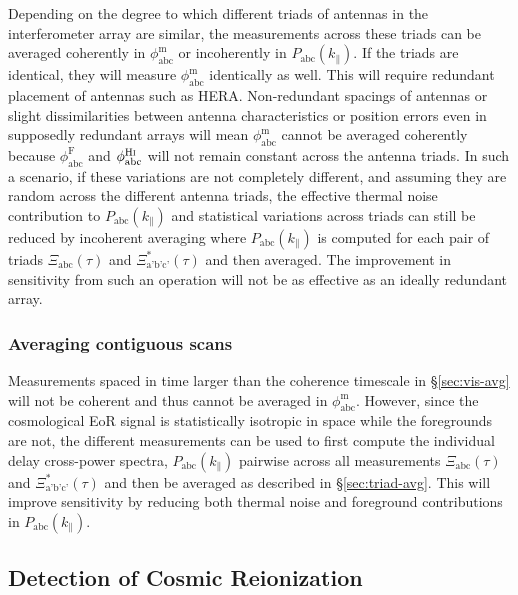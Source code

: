\documentclass[
reprint,
superscriptaddress,
amsmath,
amssymb,
aps,
]{revtex4-1}
\begin{document}
Depending on the degree to which different triads of antennas in the interferometer array are similar, the measurements across these triads can be averaged coherently in $\phi_\textrm{abc}^\textrm{m}$ or incoherently in $P_\textrm{abc}(k_\parallel)$. If the triads are identical, they will measure $\phi_\textrm{abc}^\textrm{m}$ identically as well. This will require redundant placement of antennas such as HERA. Non-redundant spacings of antennas or slight dissimilarities between antenna characteristics or position errors even in supposedly redundant arrays will mean $\phi_\textrm{abc}^\textrm{m}$ cannot be averaged coherently because $\phi_\textrm{abc}^\textrm{F}$ and $\phi_\textrm{abc}^\textrm{H{\sc i}}$ will not remain constant across the antenna triads. In such a scenario, if these variations are not completely different, and assuming they are random across the different antenna triads, the effective thermal noise contribution to $P_\textrm{abc}(k_\parallel)$ and statistical variations across triads can still be reduced by incoherent averaging where $P_\textrm{abc}(k_\parallel)$ is computed for each pair of triads $\Xi_\textrm{abc}(\tau)$ and $\Xi_\textrm{a'b'c'}^*(\tau)$ and then averaged. The improvement in sensitivity from such an operation will not be as effective as an ideally redundant array.

\subsubsection{Averaging contiguous scans}\label{sec:utc-avg}

Measurements spaced in time larger than the coherence timescale in \S\ref{sec:vis-avg} will not be coherent and thus cannot be averaged in $\phi_\textrm{abc}^\textrm{m}$. However, since the cosmological EoR signal is statistically isotropic in space while the foregrounds are not, the different measurements can be used to first compute the individual delay cross-power spectra, $P_\textrm{abc}(k_\parallel)$ pairwise across all measurements $\Xi_\textrm{abc}(\tau)$ and $\Xi_\textrm{a'b'c'}^*(\tau)$ and then be averaged as described in \S\ref{sec:triad-avg}. This will improve sensitivity by reducing both thermal noise and foreground contributions in $P_\textrm{abc}(k_\parallel)$. 


\subsection{Detection of Cosmic Reionization}\label{sec:EoR-detection}
\end{document}
